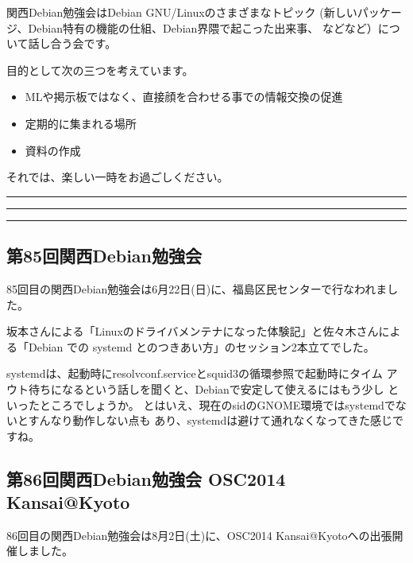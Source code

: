 \documentclass[mingoth,a4paper]{jsarticle}
\begin{document}
 関西Debian勉強会はDebian GNU/Linuxのさまざまなトピック
 (新しいパッケージ、Debian特有の機能の仕組、Debian界隈で起こった出来事、
 などなど）について話し合う会です。

 目的として次の三つを考えています。
 \begin{itemize}
  \item MLや掲示板ではなく、直接顔を合わせる事での情報交換の促進
  \item 定期的に集まれる場所
  \item 資料の作成
 \end{itemize}

 それでは、楽しい一時をお過ごしください。

\newpage

\begin{minipage}[b]{0.2\hsize}
 {}
\end{minipage}
\begin{minipage}[b]{0.8\hsize}
\hrule
\vspace{2mm}
\hrule
\setcounter{tocdepth}{1}
\tableofcontents
\vspace{2mm}
\hrule
\end{minipage}


\subsection{第85回関西Debian勉強会}

85回目の関西Debian勉強会は6月22日(日)に、福島区民センターで行なわれまし
た。

坂本さんによる「Linuxのドライバメンテナになった体験記」と佐々木さんによ
る「Debian での systemd とのつきあい方」のセッション2本立てでした。

systemdは、起動時にresolvconf.serviceとsquid3の循環参照で起動時にタイム
アウト待ちになるという話しを聞くと、Debianで安定して使えるにはもう少し
といったところでしょうか。
とはいえ、現在のsidのGNOME環境ではsystemdでないとすんなり動作しない点も
あり、systemdは避けて通れなくなってきた感じですね。

\subsection{第86回関西Debian勉強会 OSC2014 Kansai@Kyoto}

86回目の関西Debian勉強会は8月2日(土)に、OSC2014 Kansai@Kyotoへの出張開
催しました。
\end{document}
